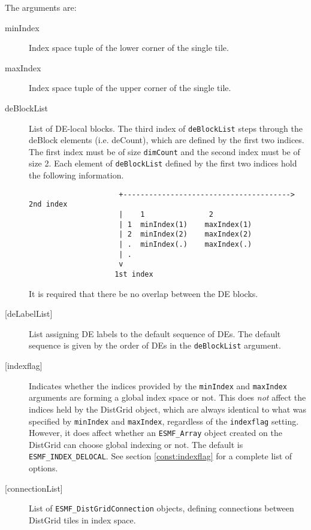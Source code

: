       The arguments are:
       \begin{description}
       \item[minIndex]
            Index space tuple of the lower corner of the single tile.
       \item[maxIndex]
            Index space tuple of the upper corner of the single tile.
       \item[deBlockList]
            List of DE-local blocks. The third index of {\tt deBlockList}
            steps through the deBlock elements (i.e. deCount), which are defined
            by the first two indices. 
            The first index must be of size {\tt dimCount} and the 
            second index must be of size 2. Each element of {\tt deBlockList}
            defined by the first two indices hold the following information.
            \begin{verbatim}
                     +---------------------------------------> 2nd index
                     |    1               2           
                     | 1  minIndex(1)    maxIndex(1)
                     | 2  minIndex(2)    maxIndex(2)
                     | .  minIndex(.)    maxIndex(.)
                     | .
                     v
                    1st index
            \end{verbatim}
            It is required that there be no overlap between the DE blocks.
       \item[{[deLabelList]}]
            List assigning DE labels to the default sequence of DEs. The default
            sequence is given by the order of DEs in the {\tt deBlockList} 
            argument.
       \item[{[indexflag]}]
            Indicates whether the indices provided by the {\tt minIndex} and
            {\tt maxIndex} arguments are forming a global
            index space or not. This does {\em not} affect the indices held
            by the DistGrid object, which are always identical to what was
            specified by {\tt minIndex} and {\tt maxIndex}, regardless of the
            {\tt indexflag} setting. However, it does affect whether an
            {\tt ESMF\_Array} object created on the DistGrid can choose global
            indexing or not. The default is {\tt ESMF\_INDEX\_DELOCAL}.
            See section \ref{const:indexflag} for a complete list of options.
       \item[{[connectionList]}]
            List of {\tt ESMF\_DistGridConnection} objects, defining connections
            between DistGrid tiles in index space.

\end{description}
